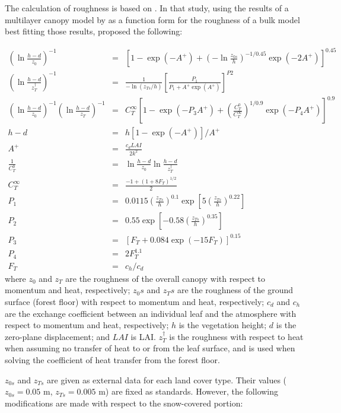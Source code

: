 The calculation of roughness is based on \citet{Watanabe1994-sx}. In that study, using the results of a multilayer canopy model by \citet{Kondo1992-ut} as a function form for the roughness of a bulk
model best fitting those results, \citet{Watanabe1994-sx} proposed the following:

\begin{eqnarray}
 \left(\ln \frac{h-d}{z_0}\right)^{-1} &=&
 \left[ 1 - \exp( -A^+) + \left(-\ln \frac{z_{0s}}{h}\right)^{-1/0.45}
  \exp(-2A^+)\right]^{0.45} \\
 \left(\ln \frac{h-d}{z_T^{\dagger}}\right)^{-1} &=&
 \frac{1}{-\ln(z_{Ts}/h)} \left[ \frac{P_1}{P_1 + A^+ \exp({A^+})}\right] ^{P2} \\
 \left(\ln \frac{h-d}{z_0}\right)^{-1} \left(\ln \frac{h-d}{z_T}\right)^{-1}
 &=& C_T^{\infty} \left[1-\exp(-P_3 A^+)
  + \left(\frac{C_T^0}{C_T^{\infty}}\right)^{1/0.9} \exp(-P_4 A^+)\right]^{0.9} \\
 h-d &=& h [1-\exp(-A^+)] / {A^+} \\
 A^+ &=& \frac{c_d LAI}{2k^2} \\
 \frac1{C_T^0} &=& \ln \frac{h-d}{z_0} \ln \frac{h-d}{z_T^{\dagger}} \\
 C_T^{\infty} &=& \frac{-1+(1+8F_T)^{1/2}}{2} \\
 P_1 &=& 0.0115 \left(\frac{z_{Ts}}{h}\right)^{0.1}
  \exp\left[5 \left(\frac{z_{Ts}}{h}\right)^{0.22}\right] \\
 P_2 &=& 0.55 \exp\left[-0.58 \left(\frac{z_{Ts}}{h}\right)^{0.35}\right] \\
 P_3 &=& [F_T + 0.084 \exp(-15 F_T)]^{0.15} \\
 P_4 &=& 2 F_T^{1.1} \\
 F_T &=& c_h / c_d
\end{eqnarray} where \(z_0\) and \(z_T\) are the roughness of the overall canopy with respect to momentum and heat, respectively; \(z_0s\) and \(z_Ts\) are the roughness of the ground surface (forest floor) with
respect to momentum and heat, respectively; \(c_d\) and \(c_h\) are the exchange coefficient between an individual leaf and the atmosphere with respect to momentum and heat, respectively; \(h\) is the
vegetation height; \(d\) is the zero-plane displacement; and \(LAI\) is LAI. \(z_T^{\dagger}\) is the roughness with respect to heat when assuming no transfer of heat to or from the leaf surface, and
is used when solving the coefficient of heat transfer from the forest floor.

\(z_{0s}\) and \(z_{Ts}\) are given as external data for each land cover type. Their values (\(z_{0s}=0.05\) m, \(z_{Ts}=0.005\) m) are fixed as standards. However, the following modifications are
made with respect to the snow-covered portion:

